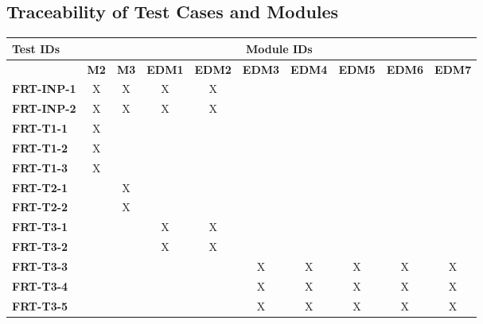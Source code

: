 \documentclass[12pt, titlepage]{article}
\begin{document}
\begin{enumerate}
\section{Traceability of Test Cases and Modules}
\begin{longtable}{|l|ccccccccc|}
   \hline
   \textbf{Test IDs}  & \multicolumn{9}{c|}{\textbf{Module IDs}}                                               \\
   \hline
   ~                  & \textbf{M2}                              & \textbf{M3} & \textbf{EDM1} & \textbf{EDM2} & \textbf{EDM3} & \textbf{EDM4} & \textbf{EDM5} & \textbf{EDM6} & \textbf{EDM7} \\
   \hline
   \textbf{FRT-INP-1}  & X                                        & X           & X             & X             & ~ & ~ & ~ & ~ & ~\\
   \textbf{FRT-INP-2}  & X                                        & X           & X             & X             & ~ & ~ & ~ & ~ & ~\\
   \textbf{FRT-T1-1}  & X                                        & ~           & ~             & ~             & ~ & ~ & ~ & ~ & ~\\
   \textbf{FRT-T1-2}  & X                                        & ~           & ~             & ~             & ~ & ~ & ~ & ~ & ~\\
   \textbf{FRT-T1-3}  & X                                        & ~           & ~             & ~             & ~ & ~ & ~ & ~ & ~\\
   \textbf{FRT-T2-1}  & ~                                        & X           & ~             & ~             & ~ & ~ & ~ & ~ & ~\\
   \textbf{FRT-T2-2}  & ~                                        & X           & ~             & ~             & ~ & ~ & ~ & ~ & ~\\
   \textbf{FRT-T3-1}  & ~                                        & ~           & X             & X             & ~ & ~ & ~ & ~ & ~\\
   \textbf{FRT-T3-2}  & ~                                        & ~           & X             & X             & ~ & ~ & ~ & ~ & ~\\
   \textbf{FRT-T3-3}  & ~                                        & ~           & ~             & ~             & X & X & X & X & X\\
   \textbf{FRT-T3-4}  & ~                                        & ~           & ~             & ~             & X & X & X & X & X\\
   \textbf{FRT-T3-5}  & ~                                        & ~           & ~             & ~             & X & X & X & X & X\\
   \hline
\end{longtable}



\end{enumerate}
\end{document}
